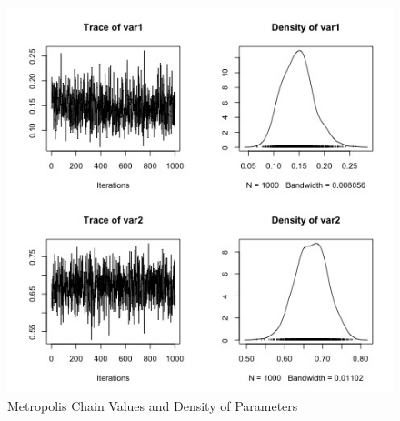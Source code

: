 \documentclass[11pt,a4paper]{article}
\begin{document}
\begin{figure}[h!]
  \includegraphics[scale=0.33]{images/metropolis_0_100.jpg}
  \caption{Metropolis Chain Values and Density of Parameters}
\end{figure}
\end{document}
